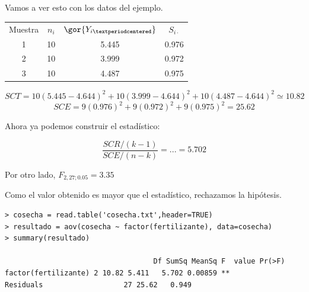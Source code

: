 \begin{example}
Vamos a ver esto con los datos del ejemplo.

\begin{center}
\begin{tabular}{cccc}
Muestra & $n_i$ & $\gor{Y_{i·}}$ & $S_{i·}$\\
1 & 10 & 5.445 & 0.976\\
2 & 10 & 3.999 & 0.972\\
3 & 10 & 4.487 & 0.975
\end{tabular}
\end{center}

\[SCT = 10(5.445 - 4.644)^2 + 10(3.999 - 4.644)^2 + 10(4.487 - 4.644)^2 \simeq 10.82\]
\[SCE = 9(0.976)^2 +9(0.972)^2 +9(0.975)^2  = 25.62\]

Ahora ya podemos construir el estadístico:

\[
\frac{SCR/(k-1)}{SCE/(n-k)} = ... = 5.702
\]

Por otro lado, $F_{2,27;0.05} = 3.35$

Como el valor obtenido es mayor que el estadístico, rechazamos la hipótesis.

\begin{lstlisting}[style=mystyle]
> cosecha = read.table('cosecha.txt',header=TRUE)
> resultado = aov(cosecha ~ factor(fertilizante), data=cosecha)
> summary(resultado)

							       Df SumSq MeanSq F  value Pr(>F)
factor(fertilizante) 2 10.82 5.411   5.702 0.00859 **
Residuals 					27 25.62   0.949
\end{lstlisting}

\end{example}
